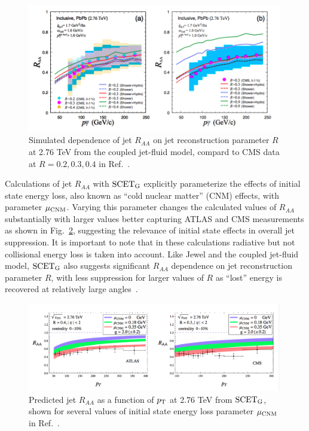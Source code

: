 \begin{figure}[ht!]
\begin{center}
\includegraphics[width=0.99\textwidth]{figures/Models/JetFluid_Raa.png}
\caption[Simulated dependence of jet $R_{AA}$ on $R$ at 2.76 TeV with the coupled jet-fluid model]{Simulated dependence of jet $R_{AA}$ on jet reconstruction parameter $R$ at 2.76 TeV from the coupled jet-fluid model, compard to CMS data at $R = 0.2, 0.3, 0.4$ in Ref.~\cite{Tachibana:2017syd}.}
\label{fig:jet_fluid_raa}
\end{center}
\end{figure}

Calculations of jet $R_{AA}$ with $\rm SCET_{G}$ explicitly parameterize the effects of initial state energy loss, also known as ``cold nuclear matter'' (CNM) effects, with parameter $\mu_{\rm CNM}$.  Varying this parameter changes the calculated values of $R_{AA}$ substantially with larger values better capturing ATLAS and CMS measurements as shown in Fig.~\ref{fig:SCET_raa}, suggesting the relevance of initial state effects in overall jet suppression.  It is important to note that in these calculations radiative but not collisional energy loss is taken into account.  Like {\sc Jewel} and the coupled jet-fluid model, $\rm SCET_{G}$ also suggests significant $R_{AA}$ dependence on jet reconstruction parameter $R$, with less suppression for larger values of $R$ as ``lost'' energy is recovered at relatively large angles~\cite{Chien:2015hda}.  

\begin{figure}[ht!]
\begin{center}
\includegraphics[width=0.99\textwidth]{figures/Models/SCET_Raa.png}
\caption[Predicted jet $R_{AA}$ as a function of $p_{\rm T}$ at 2.76 TeV from $\rm SCET_{G}$]{Predicted jet $R_{AA}$ as a function of $p_{\rm T}$ at 2.76 TeV from $\rm SCET_{G}$, shown for several values of initial state energy loss parameter $\mu_{\rm CNM}$ in Ref.~\cite{Chien:2015hda}.}
\label{fig:SCET_raa}
\end{center}
\end{figure}

